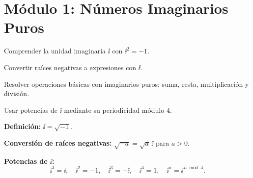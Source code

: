 
\section*{Módulo 1: Números Imaginarios Puros}

\begin{objetivos}
  \item Comprender la unidad imaginaria $\ii$ con $\ii^2=-1$.
  \item Convertir raíces negativas a expresiones con $\ii$.
  \item Resolver operaciones básicas con imaginarios puros: suma, resta, multiplicación y división.
  \item Usar potencias de $\ii$ mediante su periodicidad módulo $4$.
\end{objetivos}

\begin{marcoteorico}
  \item \textbf{Definición:} $\ii=\sqrt{-1}$.
  \item \textbf{Conversión de raíces negativas:} $\sqrt{-a}=\sqrt{a}\,\ii$ para $a>0$.
  \item \textbf{Potencias de $\ii$:}
  \[
    \ii^1=\ii, \quad \ii^2=-1, \quad \ii^3=-\ii, \quad \ii^4=1,
    \quad \ii^{n}=\ii^{\,n \bmod 4}.
  \]
\end{marcoteorico}